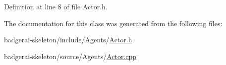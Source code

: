 Definition at line 8 of file Actor.\-h.



The documentation for this class was generated from the following files\-:\begin{DoxyCompactItemize}
\item 
badgerai-\/skeleton/include/\-Agents/\hyperlink{Actor_8h}{Actor.\-h}\item 
badgerai-\/skeleton/source/\-Agents/\hyperlink{Actor_8cpp}{Actor.\-cpp}\end{DoxyCompactItemize}
